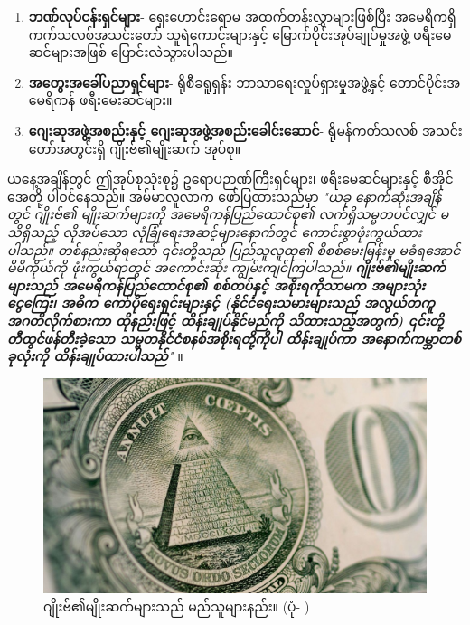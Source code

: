 \documentclass[10pt,twocolumn,letterpaper]{article}
\begin{document}
\begin{flushleft}
\begin{enumerate}
    \item \textbf{ဘဏ်လုပ်ငန်းရှင်များ}- ရှေးဟောင်းရောမ အထက်တန်းလွှာများဖြစ်ပြီး အမေရိကရှိ ကက်သလစ်အသင်းတော် သူရဲကောင်းများနှင့် မြောက်ပိုင်းအုပ်ချုပ်မှုအဖွဲ့ ဖရီးမေဆင်များအဖြစ် ပြောင်းလဲသွားပါသည်။
    \item \textbf{အတွေးအခေါ်ပညာရှင်များ}- ရိုစီခရူရှန်း ဘာသာရေးလှုပ်ရှားမှုအဖွဲ့နှင့် တောင်ပိုင်းအမေရိကန် ဖရီးမေးဆင်များ။
    \item \textbf{ဂျေးဆုအဖွဲ့အစည်းနှင့် ဂျေးဆုအဖွဲ့အစည်းခေါင်းဆောင်}- ရိုမန်ကတ်သလစ် အသင်းတော်အတွင်းရှိ ဂျိုးဗ်၏မျိုးဆက် အုပ်စု။
\end{enumerate}
\end{flushleft}
ယနေ့အချိန်တွင် ဤအုပ်စုသုံးစု၌ ဥရောပဉာဏ်ကြီးရှင်များ၊ ဖရီးမေဆင်များနှင့် စီအိုင်အေတို့ ပါဝင်နေသည်။ အမ်မာလူလာက ဖော်ပြထားသည်မှာ \textit{"ယခု နောက်ဆုံးအချိန်တွင် ဂျိုးဗ်၏ မျိုးဆက်များကို အမေရိကန်ပြည်ထောင်စု၏ လက်ရှိသမ္မတပင်လျှင် မသိရှိသည့် လိုအပ်သော လုံခြုံရေးအဆင့်များနောက်တွင် ကောင်းစွာဖုံးကွယ်ထားပါသည်။ တစ်နည်းဆိုရသော် ၎င်းတို့သည် ပြည်သူလူထု၏ စိစစ်မေးမြန်းမှု မခံရအောင် မိမိကိုယ်ကို ဖုံးကွယ်ရာတွင် အကောင်းဆုံး ကျွမ်းကျင်ကြပါသည်။ \textbf{ဂျိုးဗ်၏မျိုးဆက်များသည် အမေရိကန်ပြည်ထောင်စု၏ စစ်တပ်နှင့် အစိုးရကိုသာမက အများသုံးငွေကြေး၊ အဓိက ကော်ပိုရေးရှင်းများနှင့် (နိုင်ငံရေးသမားများသည် အလွယ်တကူ အဂတိလိုက်စားကာ ထိုနည်းဖြင့် ထိန်းချုပ်နိုင်မည်ကို သိထားသည့်အတွက်) ၎င်းတို့တီထွင်ဖန်တီးခဲ့သော သမ္မတနိုင်ငံစနစ်အစိုးရတို့ကိုပါ ထိန်းချုပ်ကာ အနောက်ကမ္ဘာတစ်ခုလုံးကို ထိန်းချုပ်ထားပါသည်}"} \cite{33,34}။

\begin{figure}[t]
\begin{center}
   \includegraphics[width=1\linewidth]{illuminati.jpg}
\end{center}
   \caption{ဂျိုးဗ်၏မျိုးဆက်များသည် မည်သူများနည်း။ (ပုံ- \cite{35})}
\label{fig:10}
\label{fig:onecol}
\end{figure}
\end{document}
